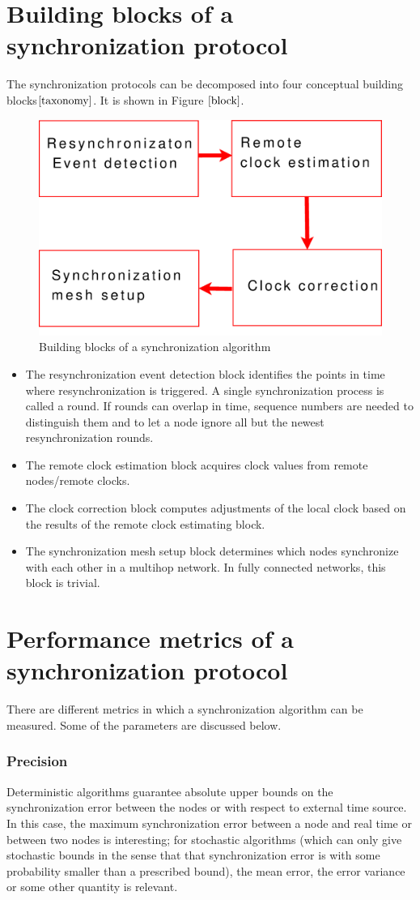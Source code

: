 \documentclass[a4paper,10pt]{report}
\begin{document}
\section{\textbf{Building blocks of a synchronization protocol}}
The synchronization protocols can be decomposed into four conceptual building blocks$\cite{taxonomy}$. It is shown in Figure
$\ref{block}$.
\begin{figure}
 \centering
\includegraphics[width= 0.6 \textwidth]{buildingblock}
\caption{Building blocks of a synchronization algorithm}
\label{block}
\end{figure}
\begin{itemize}
\item The resynchronization event detection block identifies the points in time where resynchronization is triggered. A single synchronization process is called a round. If rounds can overlap in time, sequence numbers are needed to distinguish them and to let a node ignore all but the newest resynchronization rounds.
\item The remote clock estimation block acquires clock values from remote nodes/remote clocks.
\item The clock correction block computes adjustments of the local clock based on the results of the remote clock estimating block.
\item The synchronization mesh setup block determines which nodes synchronize with each other in a multihop network. In fully connected networks, this block is trivial.
\end{itemize}
\section{\textbf{Performance metrics of a synchronization protocol}}
There are different metrics in which a synchronization algorithm can be measured. Some of the parameters are discussed below.
\subsubsection{\textbf{Precision}}
Deterministic algorithms guarantee absolute upper bounds on the synchronization error between the nodes or with respect to external time source. In this case, the maximum synchronization error between a node and real time or between two nodes is interesting; for stochastic algorithms (which can only give stochastic bounds in the sense that that synchronization error is with some probability smaller than a prescribed bound), the mean error, the error variance or some other quantity is relevant.
\end{document}
